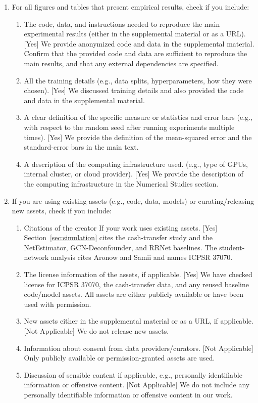 \begin{enumerate}
  \item For all figures and tables that present empirical results, check if you include:
  \begin{enumerate}
    \item The code, data, and instructions needed to reproduce the main experimental results (either in the supplemental material or as a URL). [Yes] We provide anonymized code and data in the supplemental material. Confirm that the provided code and data are sufficient to reproduce the main results, and that any external dependencies are specified.
    \item All the training details (e.g., data splits, hyperparameters, how they were chosen). [Yes] We discussed training details and also provided the code and data in the supplemental material. 
    \item A clear definition of the specific measure or statistics and error bars (e.g., with respect to the random seed after running experiments multiple times). [Yes] We provide the definition of the mean-squared error and the standard-error bars in the main text. 
    \item A description of the computing infrastructure used. (e.g., type of GPUs, internal cluster, or cloud provider). [Yes] We provide the description of the computing infrastructure in the Numerical Studies section.
  \end{enumerate}

  \item If you are using existing assets (e.g., code, data, models) or curating/releasing new assets, check if you include:
  \begin{enumerate}
    \item Citations of the creator If your work uses existing assets. [Yes] Section~\ref{sec:simulation} cites the cash-transfer study and the NetEstimator, GCN-Deconfounder, and RRNet baselines. The student-network analysis cites Aronow and Samii and names ICPSR 37070. 
    \item The license information of the assets, if applicable. [Yes] We have checked license for ICPSR 37070, the cash-transfer data, and any reused baseline code/model assets. All assets are either publicly available or have been used with permission. 
    \item New assets either in the supplemental material or as a URL, if applicable. [Not Applicable] We do not release new assets. 
    \item Information about consent from data providers/curators. [Not Applicable] Only publicly available or permission-granted assets are used.
    \item Discussion of sensible content if applicable, e.g., personally identifiable information or offensive content.  [Not Applicable] We do not include any personally identifiable information or offensive content in our work.
  \end{enumerate}


\end{enumerate}
